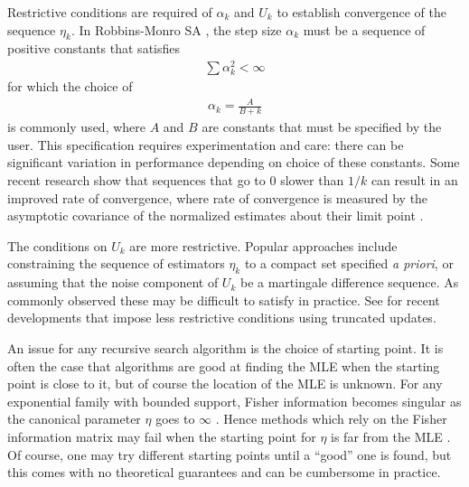 Restrictive conditions are required of $\alpha_k$ and $U_k$ to establish convergence 
of the sequence $\eta_k$.  
In Robbins-Monro SA \citep{Robbins-Monro}, the step size $\alpha_k$ must be a sequence 
of positive constants 
that satisfies 
\begin{align*}
	\sum \alpha_k^2 < \infty
\end{align*}
for which the choice of
\begin{align} \label{E:SA step size}
	\alpha_k = \frac{A}{B + k}
\end{align}
 is commonly used, where $A$ and $B$ are constants that must be specified by the user.  
This specification requires experimentation and care: there can be significant 
variation in performance depending on choice of these constants. 
Some recent research show that sequences that go to 0 
slower than $1/k$ can result in an improved rate of convergence,  where rate of
convergence is measured by the asymptotic covariance of the normalized estimates about 
their limit point \citep[Chapter 11]{Kushner:1997}.

The conditions on $U_k$ are more restrictive.  Popular approaches include constraining 
the sequence of estimators $\eta_k$ to a compact set specified \emph{a priori}, 
or assuming that the noise component of $U_k$ be a martingale 
difference sequence.  As commonly observed \citep*{Chen:2002,Andrieu:2005,Liang:2010} 
these may be 
difficult to satisfy in practice.  
See \citet{Andrieu:2005,Liang:2010} for recent developments that impose less 
restrictive conditions using truncated 
updates.

An issue for any recursive search algorithm is the 
choice of starting point.  It is 
often the case that algorithms are good at finding the MLE when the starting point is 
close to it, but of course the 
location of the MLE is unknown.  For any exponential family with bounded support, 
Fisher information 
becomes singular as the canonical parameter $\eta$ goes to $\infty$ \citep*{Rinaldo:2009}.
Hence methods which rely on 
the Fisher information matrix may fail when the starting point for $\eta$ is far from 
the MLE \citep{Younes:1989,Gu:2001}.
Of course, one may try different starting points until a ``good'' one is found, but 
this comes with no theoretical guarantees and can be cumbersome in practice.

